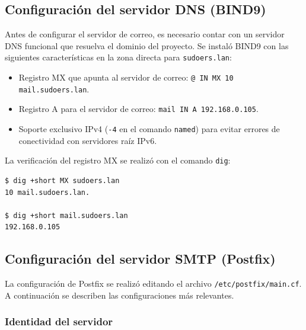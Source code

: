 \subsection{Configuración del servidor DNS (BIND9)}

Antes de configurar el servidor de correo, es necesario contar con un servidor
DNS funcional que resuelva el dominio del proyecto. Se instaló BIND9 con las
siguientes características en la zona directa para \texttt{sudoers.lan}:

\begin{itemize}
  \item Registro MX que apunta al servidor de correo: \texttt{@ IN MX 10 mail.sudoers.lan}.
  \item Registro A para el servidor de correo: \texttt{mail IN A 192.168.0.105}.
  \item Soporte exclusivo IPv4 (\texttt{-4} en el comando \texttt{named}) para
        evitar errores de conectividad con servidores raíz IPv6.
\end{itemize}

La verificación del registro MX se realizó con el comando \texttt{dig}:

\begin{lstlisting}[style=terminal]
$ dig +short MX sudoers.lan
10 mail.sudoers.lan.

$ dig +short mail.sudoers.lan
192.168.0.105
\end{lstlisting}


\subsection{Configuración del servidor SMTP (Postfix)}

La configuración de Postfix se realizó editando el archivo
\texttt{/etc/postfix/main.cf}. A continuación se describen las configuraciones
más relevantes.

\subsubsection{Identidad del servidor}

